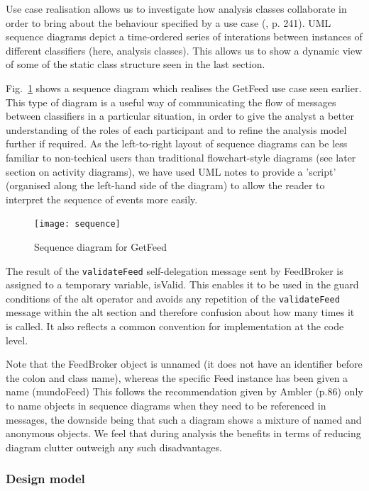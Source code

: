 \documentclass[runningheads,a4paper]{llncs}
\begin{document}
Use case realisation allows us to investigate how analysis classes collaborate in order to bring about the behaviour specified by a use case (\cite{arlow}, p. 241). UML sequence diagrams depict a time-ordered series of interations between instances of different classifiers (here, analysis classes). This allows us to show a dynamic view of some of the static class structure seen in the last section.

Fig.~\ref{fig:sequence-diagram-image} shows a sequence diagram which realises the \textsf{GetFeed} use case seen earlier. This type of diagram is a useful way of communicating the flow of messages between classifiers in a particular situation, in order to give the analyst a better understanding of the roles of each participant and to refine the analysis model further if required. As the left-to-right layout of sequence diagrams can be less familiar to non-techical users than traditional flowchart-style diagrams (see later section on activity diagrams), we have used UML notes to provide a 'script' (organised along the left-hand side of the diagram) to allow the reader to interpret the sequence of events more easily.

\begin{figure}
\centering
\texttt{[image: sequence]}
\caption{Sequence diagram for \textsf{GetFeed}}
\label{fig:sequence-diagram-image}
\end{figure}

The result of the \texttt{validateFeed} self-delegation message sent by \textsf{FeedBroker} is assigned to a temporary variable, \textsf{isValid}. This enables it to be used in the guard conditions of the \textsf{alt} operator and avoids any repetition of the \texttt{validateFeed} message within the \textsf{alt} section and therefore confusion about how many times it is called. It also reflects a common convention for implementation at the code level.

Note that the \textsf{FeedBroker} object is unnamed (it does not have an identifier before the colon and class name), whereas the specific \textsf{Feed} instance has been given a name (\textsf{mundoFeed}) This follows the recommendation given by Ambler \cite{ambler} (p.86) only to name objects in sequence diagrams when they need to be referenced in messages, the downside being that such a diagram shows a mixture of named and anonymous objects. We feel that during analysis the benefits in terms of reducing diagram clutter outweigh any such disadvantages.


\subsubsection{Design model}
\end{document}
